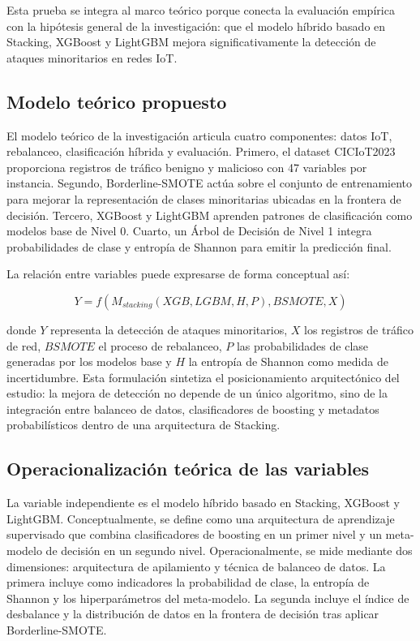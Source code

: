\documentclass[12pt,a4paper]{article}
\begin{document}
Esta prueba se integra al marco teórico porque conecta la evaluación empírica con la hipótesis general de la investigación: que el modelo híbrido basado en Stacking, XGBoost y LightGBM mejora significativamente la detección de ataques minoritarios en redes IoT.

\subsection{Modelo teórico propuesto}

El modelo teórico de la investigación articula cuatro componentes: datos IoT, rebalanceo, clasificación híbrida y evaluación. Primero, el dataset CICIoT2023 proporciona registros de tráfico benigno y malicioso con 47 variables por instancia. Segundo, Borderline-SMOTE actúa sobre el conjunto de entrenamiento para mejorar la representación de clases minoritarias ubicadas en la frontera de decisión. Tercero, XGBoost y LightGBM aprenden patrones de clasificación como modelos base de Nivel 0. Cuarto, un Árbol de Decisión de Nivel 1 integra probabilidades de clase y entropía de Shannon para emitir la predicción final.

La relación entre variables puede expresarse de forma conceptual así:

\[
Y = f(M_{stacking}(XGB, LGBM, H, P), BSMOTE, X)
\]

donde $Y$ representa la detección de ataques minoritarios, $X$ los registros de tráfico de red, $BSMOTE$ el proceso de rebalanceo, $P$ las probabilidades de clase generadas por los modelos base y $H$ la entropía de Shannon como medida de incertidumbre. Esta formulación sintetiza el posicionamiento arquitectónico del estudio: la mejora de detección no depende de un único algoritmo, sino de la integración entre balanceo de datos, clasificadores de boosting y metadatos probabilísticos dentro de una arquitectura de Stacking.

\subsection{Operacionalización teórica de las variables}

La variable independiente es el modelo híbrido basado en Stacking, XGBoost y LightGBM. Conceptualmente, se define como una arquitectura de aprendizaje supervisado que combina clasificadores de boosting en un primer nivel y un meta-modelo de decisión en un segundo nivel. Operacionalmente, se mide mediante dos dimensiones: arquitectura de apilamiento y técnica de balanceo de datos. La primera incluye como indicadores la probabilidad de clase, la entropía de Shannon y los hiperparámetros del meta-modelo. La segunda incluye el índice de desbalance y la distribución de datos en la frontera de decisión tras aplicar Borderline-SMOTE.
\end{document}
